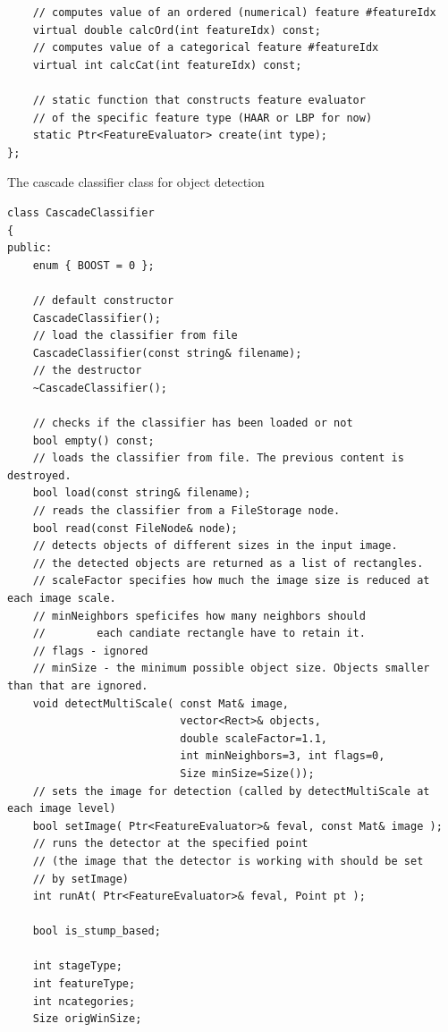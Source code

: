 \begin{description}
\begin{lstlisting}
    // computes value of an ordered (numerical) feature #featureIdx
    virtual double calcOrd(int featureIdx) const;
    // computes value of a categorical feature #featureIdx
    virtual int calcCat(int featureIdx) const;

    // static function that constructs feature evaluator
    // of the specific feature type (HAAR or LBP for now)
    static Ptr<FeatureEvaluator> create(int type);
};
\end{lstlisting}

\label{CascadeClassifier}
The cascade classifier class for object detection

\begin{lstlisting}
class CascadeClassifier
{
public:    
    enum { BOOST = 0 };

    // default constructor
    CascadeClassifier();
    // load the classifier from file
    CascadeClassifier(const string& filename);
    // the destructor
    ~CascadeClassifier();
    
    // checks if the classifier has been loaded or not
    bool empty() const;
    // loads the classifier from file. The previous content is destroyed.
    bool load(const string& filename);
    // reads the classifier from a FileStorage node.
    bool read(const FileNode& node);
    // detects objects of different sizes in the input image.
    // the detected objects are returned as a list of rectangles.
    // scaleFactor specifies how much the image size is reduced at each image scale.
    // minNeighbors speficifes how many neighbors should
    //        each candiate rectangle have to retain it.
    // flags - ignored
    // minSize - the minimum possible object size. Objects smaller than that are ignored.
    void detectMultiScale( const Mat& image,
                           vector<Rect>& objects,
                           double scaleFactor=1.1,
                           int minNeighbors=3, int flags=0,
                           Size minSize=Size());
    // sets the image for detection (called by detectMultiScale at each image level)
    bool setImage( Ptr<FeatureEvaluator>& feval, const Mat& image );
    // runs the detector at the specified point
    // (the image that the detector is working with should be set
    // by setImage)
    int runAt( Ptr<FeatureEvaluator>& feval, Point pt );

    bool is_stump_based;

    int stageType;
    int featureType;
    int ncategories;
    Size origWinSize;


\end{lstlisting}
\end{description}
